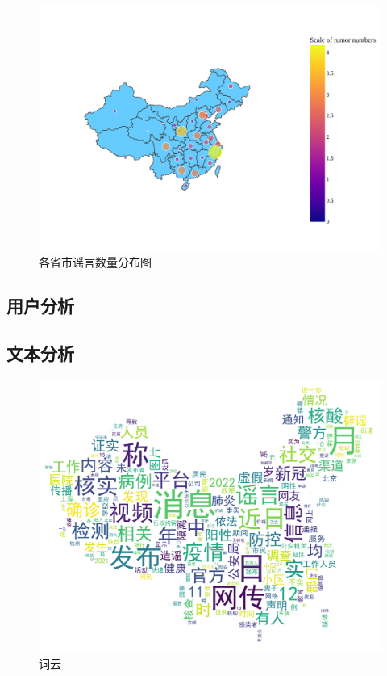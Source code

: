 \documentclass[UTF8]{ctexart}
\begin{document}
\begin{figure}[!ht]
    \includegraphics[width=\linewidth]{../figures/rumor_num_choropleth}
    \caption{各省市谣言数量分布图\protect\footnotemark}
    \label{fig:rumor_num_choropleth}
\end{figure}


\subsection{用户分析}


\subsection{文本分析}

\begin{figure}[!ht]
    \includegraphics[width=\linewidth]{../figures/wordcloud_tokens}
    \caption{词云}
    \label{fig:wordcloud_tokens}
\end{figure}
\end{document}
